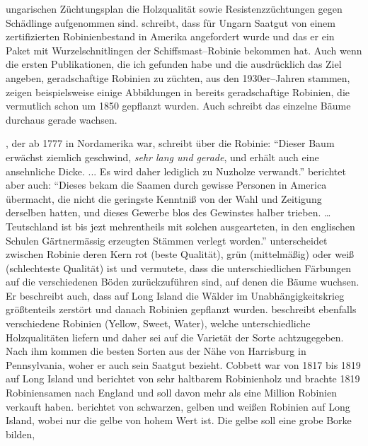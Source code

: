 \documentclass[twocolumn]{scrartcl}
\begin{document}
ungarischen Züchtungsplan die Holzqualität sowie Resistenzzüchtungen gegen
Schädlinge aufgenommen sind. \citet{mihalyi1937robinie} schreibt, dass für Ungarn
Saatgut von einem zertifizierten Robinienbestand in Amerika angefordert wurde
und das er ein Paket mit Wurzelschnitlingen der Schiffsmast--Robinie bekommen
hat.
Auch wenn die ersten Publikationen, die ich gefunden habe und die
ausdrücklich das Ziel angeben, geradschaftige Robinien zu züchten, aus den
1930er--Jahren stammen, zeigen beispielsweise einige Abbildungen in
\citet{vadas1911robinie} bereits geradschaftige Robinien, die vermutlich schon um
1850 gepflanzt wurden. Auch \cite{gaskil1906robinie} schreibt das einzelne
Bäume durchaus gerade wachsen.

\citet[S.~67]{wangenheim1781nordamericanischeHolzarten}, der ab 1777
in Nordamerika war, schreibt über die Robinie: \enquote{Dieser Baum
  erwächst ziemlich geschwind, \emph{sehr lang und gerade}, und erhält
  auch eine ansehnliche Dicke. ... Es wird daher lediglich zu Nuzholze
  verwandt.}
\citet[S.~22--23]{wangenheim1781nordamericanischeHolzarten} berichtet
aber auch: \enquote{Dieses bekam die Saamen durch gewisse Personen in
  America übermacht, die nicht die geringste Kenntniß von der Wahl und
  Zeitigung derselben hatten, und dieses Gewerbe blos des Gewinstes
  halber trieben. \dots Teutschland ist bis jezt mehrentheils mit
  solchen ausgearteten, in den englischen Schulen Gärtnermässig
  erzeugten Stämmen verlegt worden.}
\citet[S.~249]{Michaux1813arbres} unterscheidet
zwischen Robinie deren Kern rot (beste Qualität), grün (mittelmäßig)
oder weiß (schlechteste Qualität) ist und vermutete, dass die unterschiedlichen
Färbungen auf die verschiedenen Böden zurückzuführen sind, auf denen die Bäume wuchsen.
Er beschreibt auch, dass auf Long
Island die Wälder im Unabhängigkeitskrieg größtenteils zerstört und
danach Robinien gepflanzt wurden. \citet{cobbett1825woodlands}
beschreibt ebenfalls verschiedene Robinien (Yellow, Sweet, Water),
welche unterschiedliche Holzqualitäten liefern und daher sei auf die
Varietät der Sorte achtzugegeben. Nach ihm kommen die besten
Sorten aus der Nähe von Harrisburg in Pennsylvania, woher er auch
sein Saatgut bezieht. Cobbett war von 1817 bis 1819 auf Long Island
und berichtet von sehr haltbarem Robinienholz und brachte 1819
Robiniensamen nach England und soll davon mehr als eine Million
Robinien verkauft haben. \citet{hicks1883robinie} berichtet von
schwarzen, gelben und weißen Robinien auf Long Island, wobei nur die
gelbe von hohem Wert ist. Die gelbe soll eine grobe Borke bilden,
\end{document}
